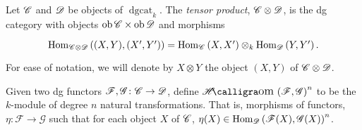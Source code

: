 \documentclass[dissertation.tex]{subfiles}
\begin{document}
\begin{defn}
  Let $\mathscr{C}$ and $\mathscr{D}$ be objects of $\operatorname{dgcat}_k$.
  The {\it tensor product}, $\mathscr{C} \otimes \mathscr{D}$, is the dg category with objects $\operatorname{ob}\mathscr{C} \times \operatorname{ob}\mathscr{D}$ and
  morphisms
  $$\begin{tikzcd}
    \Hom{\CC \otimes \D}{(X, Y), (X^\prime, Y^\prime)} = \Hom{\CC}{X,X^\prime} \otimes_k \Hom{\D}{Y,Y^\prime}.
  \end{tikzcd}$$
  For ease of notation, we will denote by $X \otimes Y$ the object $(X,Y)$ of $\mathscr{C} \otimes \mathscr{D}$.
\end{defn}

\begin{defn}
  Given two dg functors $\mathscr{F},\mathscr{G} \colon \mathscr{C} \rightarrow \mathscr{D}$, define $\SHom{\mathscr{F},\mathscr{G}}^n$ to be the $k$-module of degree $n$ natural transformations.
  That is, morphisms of functors, $\eta \colon \mathscr{F} \rightarrow \mathscr{G}$ such that for each object $X$ of $\mathscr{C}$, $\eta(X) \in \operatorname{Hom}_{\mathscr{D}}\left(\mathscr{F}(X),\mathscr{G}(X)\right)^n$.
\end{defn}
\end{document}
